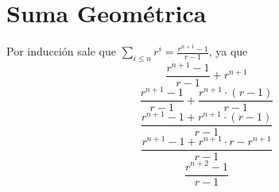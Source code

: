 \documentclass{article}
\begin{document}
\section{Suma Geométrica}
Por inducción sale que $\sum_{i \leq n} r^i = \frac{r^{n+1}-1}{r-1}$, ya que
\[\frac{r^{n+1}-1}{r-1} + r^{n+1}\]
\[\frac{r^{n+1}-1}{r-1} + \frac{r^{n+1} \cdot (r-1)}{r-1} \]
\[\frac{r^{n+1}-1 + r^{n+1} \cdot (r-1)}{r-1} \]
\[\frac{r^{n+1}-1 + r^{n+1} \cdot r - r^{n+1}}{r-1} \]
\[\frac{r^{n+2}-1}{r-1}\]
\end{document}
